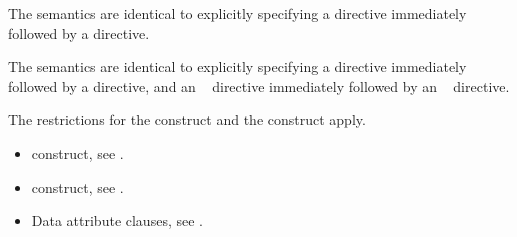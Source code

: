 \descr
\begin{ccppspecific}
The semantics are identical to explicitly specifying a  directive immediately
followed by a  directive.
\end{ccppspecific}

\begin{fortranspecific}
The semantics are identical to explicitly specifying a  directive immediately
followed by a  directive, and an ~ directive immediately
followed by an ~ directive.
\end{fortranspecific}

\restrictions
The restrictions for the  construct and the  construct apply.

\crossreferences
\begin{itemize}
\item {} construct, see
.

\item {} construct, see
.

\item Data attribute clauses, see
.
\end{itemize}









